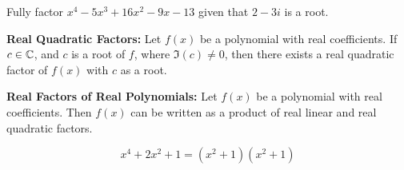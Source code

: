 \documentclass[english, 12pt]{article}
\begin{document}
\begin{exercise}
Fully factor $x^4 - 5x^3 + 16x^2 - 9x - 13 $ given that $2 - 3i$ is a root.
\end{exercise}
\begin{thrm}[RQF]
\textbf{Real Quadratic Factors:} Let $f(x)$ be a polynomial with real coefficients. If $c \in {\mathbb{C}}$, and $c$ is a root of $f$, where $\Im(c) \neq 0$, then there exists a real quadratic factor of $f(x) $ with $c$ as a root.
\end{thrm}
\begin{thrm}[RFRP]
\textbf{Real Factors of Real Polynomials:} Let $f(x)$ be a polynomial with real coefficients. Then $f(x)$ can be written as a product of real linear and real quadratic factors.
\end{thrm}
\begin{exmp}
\[x^4 + 2x^2 + 1 = (x^2+1)(x^2 + 1)\]
\end{exmp}
\end{document}
